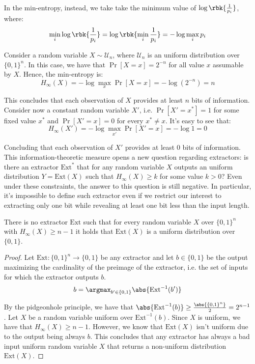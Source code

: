 \documentclass[a4paper, 12pt]{report}
\begin{document}
    In the min-entropy, instead, we take take the minimum value of $\log\rbk{\frac{1}{p_i}}$, where:
    \[\min_i \log\rbk{\frac{1}{p_i}} = \log \rbk{\min_i \frac{1}{p_i}} = - \log \max_i p_i\]

    Consider a random variable $X \sim \mathcal{U}_n$, where $\mathcal{U}_n$ is an uniform distribution over $\{0,1\}^n$. In this case, we have that $\Pr[X = x] = 2^{-n}$ for all value $x$ assumable by $X$. Hence, the min-entropy is:
    \[H_{\infty}(X) = -\log \max_x \Pr[X = x] = - \log (2^{-n}) = n\]

    This concludes that each observation of $X$ provides at least $n$ bits of information. Consider now a constant random variable $X'$, i.e. $\Pr[X' = x^*] = 1$ for some fixed value $x^*$ and $\Pr[X' = x] = 0$ for every $x^* \neq x$. It's easy to see that:
    \[H_{\infty}(X') = -\log \max_{x'} \Pr[X' = x] = -\log 1 = 0\]

    Concluding that each observation of $X'$ provides at least 0 bits of information. This information-theoretic measure opens a new question regarding extractors: is there an extractor $\mathrm{Ext}^*$ that for any random variable $X$ outputs an uniform distribution $Y = \mathrm{Ext}(X)$ such that $H_{\infty}(X) \geq k$ for some value $k > 0$? Even under these constraints, the answer to this question is still negative. In particular, it's impossible to define such extractor even if we restrict our interest to extracting only one bit while revealing at least one bit less than the input length.
    
    \begin{framedprop}{}
        There is no extractor $\mathrm{Ext}$ such that for every random variable $X$ over $\{0,1\}^n$ with $H_{\infty}(X) \geq n-1$ it holds that $\mathrm{Ext}(X)$ is a uniform distribution over $\{0,1\}$.
    \end{framedprop}

    \begin{proof}
        Let $\mathrm{Ext} : \{0,1\}^n \to \{0,1\}$ be any extractor and let $b \in \{0,1\}$ be the output maximizing the cardinality of the preimage of the extractor, i.e. the set of inputs for which the extractor outputs $b$.
        \[b = \argmax_{b' \in \{0,1\}} \abs{\mathrm{Ext}^{-1}(b')}\]

        By the pidgeonhole principle, we have that $\abs{\mathrm{Ext}^{-1}(b)} \geq \frac{\abs{\{0,1\}^n}}{2} = 2^{n-1}$. Let $X$ be a random variable uniform over $\mathrm{Ext}^{-1}(b)$. Since $X$ is uniform, we have that $H_{\infty}(X) \geq n-1$. However, we know that $\mathrm{Ext}(X)$ isn't uniform due to the output being always $b$. This concludes that any extractor has always a bad input uniform random variable $X$ that returns a non-uniform distribution $\mathrm{Ext}(X)$.
    \end{proof}
\end{document}
